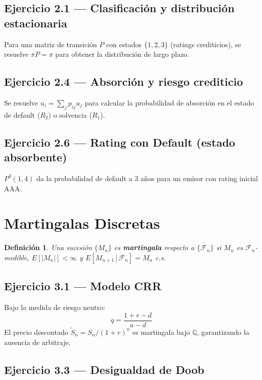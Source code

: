 \documentclass[12pt,letterpaper]{article}
\newtheorem{definition}{Definici\'on}[section]
\begin{document}
\subsection*{Ejercicio 2.1 --- Clasificaci\'on y distribuci\'on estacionaria}

Para una matriz de transici\'on $P$ con estados $\{1,2,3\}$ (ratings crediticios),
se resuelve $\pi P = \pi$ para obtener la distribuci\'on de largo plazo.

\subsection*{Ejercicio 2.4 --- Absorci\'on y riesgo crediticio}

Se resuelve $u_i = \sum_j p_{ij} u_j$ para calcular la probabilidad de absorci\'on
en el estado de default ($R_2$) o solvencia ($R_1$).

\subsection*{Ejercicio 2.6 --- Rating con Default (estado absorbente)}

$P^3(1,4)$ da la probabilidad de default a 3 a\~nos para un emisor con rating
inicial AAA.

\section{Martingalas Discretas}

\begin{definition}
  Una sucesi\'on $\{M_n\}$ es \textbf{martingala} respecto a $\{\mathcal{F}_n\}$ si
  $M_n$ es $\mathcal{F}_n$-medible, $E[|M_n|]<\infty$ y
  $E[M_{n+1}\,|\,\mathcal{F}_n] = M_n$ c.s.
\end{definition}

\subsection*{Ejercicio 3.1 --- Modelo CRR}

Bajo la medida de riesgo neutro:
\[
  q = \frac{1+r-d}{u-d}
\]
El precio descontado $\tilde{S}_n = S_n/(1+r)^n$ es martingala bajo
$\mathbb{Q}$, garantizando la ausencia de arbitraje.

\subsection*{Ejercicio 3.3 --- Desigualdad de Doob}
\end{document}

